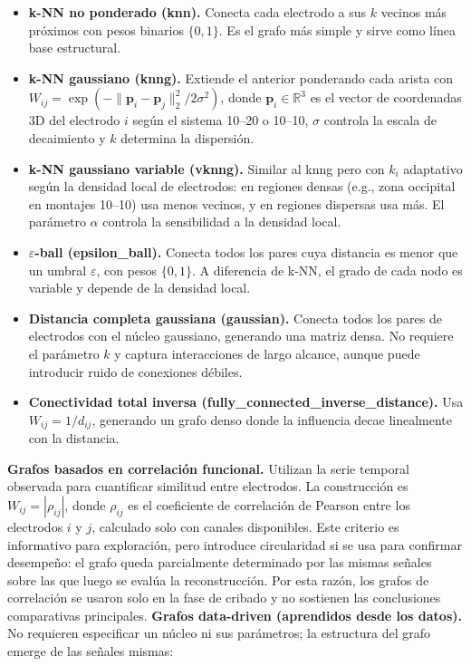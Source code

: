 \begin{itemize}[leftmargin=*,itemsep=1pt,topsep=2pt]
\item \textbf{k-NN no ponderado (knn).} Conecta cada electrodo a sus $k$ vecinos más próximos con pesos binarios $\{0,1\}$. Es el grafo más simple y sirve como línea base estructural.
\item \textbf{k-NN gaussiano (knng).} Extiende el anterior ponderando cada arista con $W_{ij} = \exp(-\|\mathbf{p}_i - \mathbf{p}_j\|_2^2 / 2\sigma^2)$, donde $\mathbf{p}_i \in \mathbb{R}^3$ es el vector de coordenadas 3D del electrodo $i$ según el sistema 10--20 o 10--10, $\sigma$ controla la escala de decaimiento y $k$ determina la dispersión.
\item \textbf{k-NN gaussiano variable (vknng).} Similar al knng pero con $k_i$ adaptativo según la densidad local de electrodos: en regiones densas (e.g., zona occipital en montajes 10--10) usa menos vecinos, y en regiones dispersas usa más. El parámetro $\alpha$ controla la sensibilidad a la densidad local.
\item \textbf{$\varepsilon$-ball (epsilon\_ball).} Conecta todos los pares cuya distancia es menor que un umbral $\varepsilon$, con pesos $\{0,1\}$. A diferencia de k-NN, el grado de cada nodo es variable y depende de la densidad local.
\item \textbf{Distancia completa gaussiana (gaussian).} Conecta todos los pares de electrodos con el núcleo gaussiano, generando una matriz densa. No requiere el parámetro $k$ y captura interacciones de largo alcance, aunque puede introducir ruido de conexiones débiles.
\item \textbf{Conectividad total inversa (fully\_connected\_inverse\_distance).} Usa $W_{ij} = 1/d_{ij}$, generando un grafo denso donde la influencia decae linealmente con la distancia.
\end{itemize}

\textbf{Grafos basados en correlación funcional.} Utilizan la serie temporal observada para cuantificar similitud entre electrodos. La construcción es $W_{ij} = |\rho_{ij}|$, donde $\rho_{ij}$ es el coeficiente de correlación de Pearson entre los electrodos $i$ y $j$, calculado solo con canales disponibles. Este criterio es informativo para exploración, pero introduce circularidad si se usa para confirmar desempeño: el grafo queda parcialmente determinado por las mismas señales sobre las que luego se evalúa la reconstrucción. Por esta razón, los grafos de correlación se usaron solo en la fase de cribado y no sostienen las conclusiones comparativas principales.
\textbf{Grafos data-driven (aprendidos desde los datos).} No requieren especificar un núcleo ni sus parámetros; la estructura del grafo emerge de las señales mismas:

